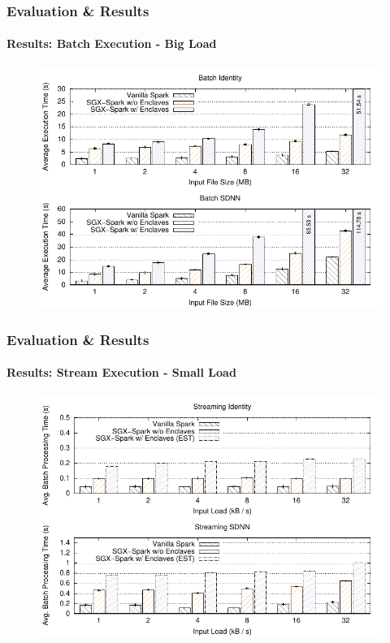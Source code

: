\documentclass[10pt,    %
    english,            %
    xcolor=table,       %
    envcountsect,        %
    aspectratio=169     %
]{beamer}
\begin{document}
\begin{frame}
    \frametitle{Evaluation \& Results}
    \framesubtitle{Results: Batch Execution - Big Load}

    \vspace{-15pt}

    \begin{figure}[T]
        \centering
        \includegraphics[width=.7\textwidth]{plots/big_input_size.pdf}
    \end{figure}

\end{frame}

\begin{frame}
    \frametitle{Evaluation \& Results}
    \framesubtitle{Results: Stream Execution - Small Load}

    \vspace{-15pt}

    \begin{figure}[T]
        \centering
        \includegraphics[width=.7\textwidth]{plots/throughput.pdf}
    \end{figure}

\end{frame}
\end{document}
